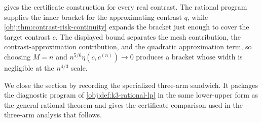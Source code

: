 \documentclass[11pt]{article}
\begin{document}
 gives the certificate construction for every real contrast. The rational program supplies the inner bracket for the approximating contrast \(q\), while \cref{obj:thm:contrast-risk-continuity} expands the bracket just enough to cover the target contrast \(c\). The displayed bound separates the mesh contribution, the contrast-approximation contribution, and the quadratic approximation term, so choosing \(M=n\) and \(n^{5/6}\eta(c,c^{(n)})\to0\) produces a bracket whose width is negligible at the \(n^{4/3}\) scale.

We close the section by recording the specialized three-arm sandwich. It packages the diagnostic program of \cref{obj:def:k3-rational-lp} in the same lower-upper form as the general rational theorem and gives the certificate comparison used in the three-arm analysis that follows.
\end{document}
